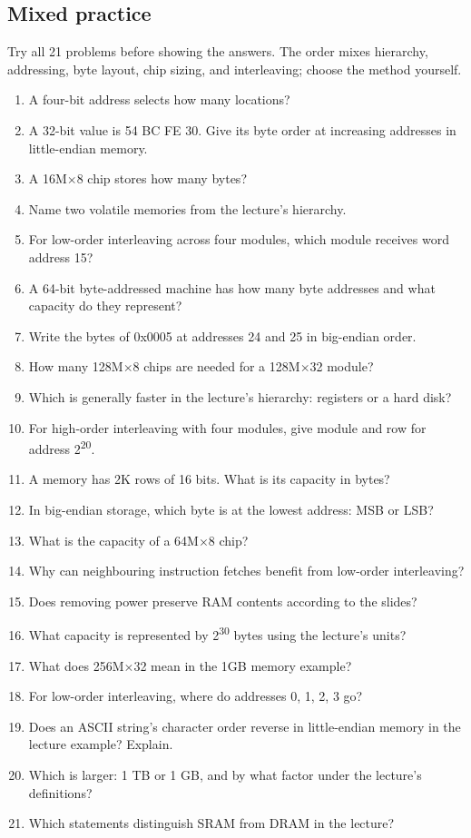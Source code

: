 \documentclass[11pt]{article}
\begin{document}
\begin{keepsection}
\section{Mixed practice}

Try all 21 problems before showing the answers. The order mixes hierarchy, addressing, byte layout, chip sizing, and interleaving; choose the method yourself.

\begin{enumerate}
\item A four-bit address selects how many locations?
\item A 32-bit value is 54 BC FE 30. Give its byte order at increasing addresses in little-endian memory.
\item A 16M\ensuremath{\times}8 chip stores how many bytes?
\item Name two volatile memories from the lecture’s hierarchy.
\item For low-order interleaving across four modules, which module receives word address 15?
\item A 64-bit byte-addressed machine has how many byte addresses and what capacity do they represent?
\item Write the bytes of 0x0005 at addresses 24 and 25 in big-endian order.
\item How many 128M\ensuremath{\times}8 chips are needed for a 128M\ensuremath{\times}32 module?
\item Which is generally faster in the lecture’s hierarchy: registers or a hard disk?
\item For high-order interleaving with four modules, give module and row for address 2\textsuperscript{20}.
\item A memory has 2K rows of 16 bits. What is its capacity in bytes?
\item In big-endian storage, which byte is at the lowest address: MSB or LSB?
\item What is the capacity of a 64M\ensuremath{\times}8 chip?
\item Why can neighbouring instruction fetches benefit from low-order interleaving?
\item Does removing power preserve RAM contents according to the slides?
\item What capacity is represented by 2\textsuperscript{30} bytes using the lecture’s units?
\item What does 256M\ensuremath{\times}32 mean in the 1GB memory example?
\item For low-order interleaving, where do addresses 0, 1, 2, 3 go?
\item Does an ASCII string’s character order reverse in little-endian memory in the lecture example? Explain.
\item Which is larger: 1 TB or 1 GB, and by what factor under the lecture’s definitions?
\item Which statements distinguish SRAM from DRAM in the lecture?
\end{enumerate}


\end{keepsection}
\end{document}
